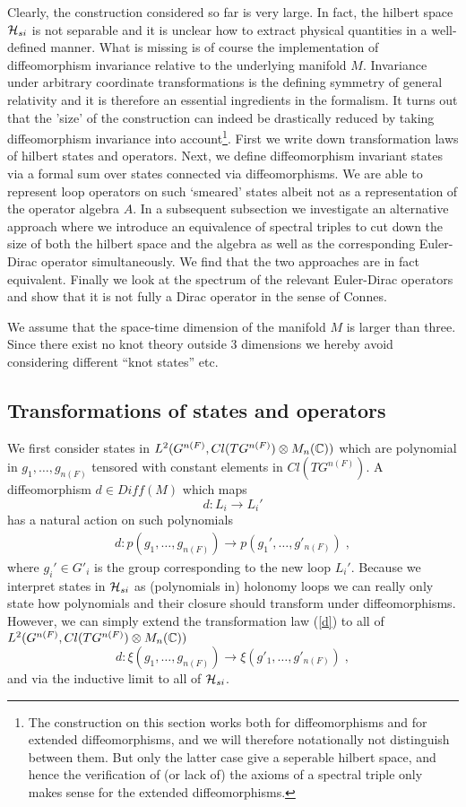 \documentclass[12pt]{article}
\newcommand{\ba}{\begin{eqnarray}}
\newcommand{\ea}{\end{eqnarray}}
\def\ch{{\cal H}}
\newcommand{\bbC}{{\Bbb C}}
\begin{document}
Clearly, the construction considered so far is very large. In fact, the
hilbert space $\ch_{si}$ is not separable and it is unclear how to extract
physical quantities in a well-defined manner. What is missing is of course
the implementation of 
diffeomorphism invariance relative to the underlying manifold
$M$. Invariance under arbitrary coordinate transformations is the defining
symmetry of general relativity and it is therefore an essential ingredients in
the formalism. It turns
out that the 'size' of the construction can indeed be drastically reduced by
taking diffeomorphism invariance into account\footnote{The construction on
  this section works both for diffeomorphisms and for extended
  diffeomorphisms, and we will therefore notationally not distinguish between
  them. But only the latter case give a seperable hilbert space, and hence the
verification of (or lack of) the axioms of a spectral triple only makes sense
for the extended diffeomorphisms.}. First we write down transformation laws of hilbert
states and operators. Next, we define diffeomorphism invariant states via a
formal sum over states connected via diffeomorphisms. We are able to represent
loop operators on such `smeared' states albeit not as a
representation of the operator algebra $A$. In a subsequent subsection we
investigate an alternative approach where we introduce an equivalence of spectral
  triples to cut down the size of both the hilbert space and the algebra as
well as the corresponding Euler-Dirac operator simultaneously. We find that
the two approaches are in fact equivalent. Finally we look at the
spectrum of the relevant Euler-Dirac operators and show that it is not fully a Dirac
operator in the sense of Connes.


We assume that the space-time dimension of the manifold $M$ is larger than
three. Since there exist no knot theory outside 3 dimensions we hereby avoid
considering different ``knot states'' etc.


\subsection{Transformations of states and operators}

We first consider states in $L^2(G^{n(F)},Cl(TG^{n(F)})\otimes M_n(\bbC))$ which are polynomial
in $g_1,\ldots,g_{n(F)}$ tensored with constant elements in $Cl(TG^{n(F)})$. A diffeomorphism $d\in Diff(M)$ which maps
\[
d:L_i\to L_i'
\]
has a natural action on such polynomials
\ba
d: p(g_1,\ldots,g_{n(F)})\to p(g_1',\ldots,g'_{n(F)})\;,
\label{d}
\ea
where $g_i'\in G'_i$ is the group corresponding to the new loop $L_i'$. 
Because we interpret states in $\ch_{si}$ as (polynomials in) holonomy loops we
can really only state how polynomials and their closure should transform under
diffeomorphisms. However, we can simply extend the transformation law
(\ref{d}) to all of $L^2(G^{n(F)},Cl(TG^{n(F)})\otimes M_n(\bbC))$ 
\[
d: \xi(g_1,\ldots,g_{n(F)}) \to \xi(g'_1,\ldots,g'_{n(F)})\;,
\]
and via the inductive limit to all of $\ch_{si}$. 
\end{document}
